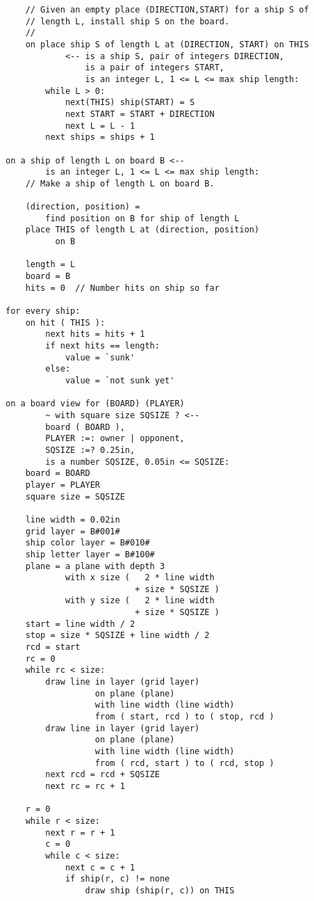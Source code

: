\documentclass[12pt]{article}
\begin{document}
\begin{verbatim}
    // Given an empty place (DIRECTION,START) for a ship S of
    // length L, install ship S on the board.
    //
    on place ship S of length L at (DIRECTION, START) on THIS
            <-- is a ship S, pair of integers DIRECTION,
                is a pair of integers START,
                is an integer L, 1 <= L <= max ship length:
        while L > 0:
            next(THIS) ship(START) = S
            next START = START + DIRECTION
            next L = L - 1
        next ships = ships + 1
    
on a ship of length L on board B <--
        is an integer L, 1 <= L <= max ship length:
    // Make a ship of length L on board B.

    (direction, position) =
        find position on B for ship of length L
    place THIS of length L at (direction, position)
          on B

    length = L
    board = B
    hits = 0  // Number hits on ship so far

for every ship:
    on hit ( THIS ):
        next hits = hits + 1
        if next hits == length:
            value = `sunk'
        else:
            value = `not sunk yet'

on a board view for (BOARD) (PLAYER)
        ~ with square size SQSIZE ? <--
        board ( BOARD ),
        PLAYER :=: owner | opponent,
        SQSIZE :=? 0.25in,
        is a number SQSIZE, 0.05in <= SQSIZE:
    board = BOARD
    player = PLAYER
    square size = SQSIZE

    line width = 0.02in
    grid layer = B#001#
    ship color layer = B#010#
    ship letter layer = B#100#
    plane = a plane with depth 3
            with x size (   2 * line width 
                          + size * SQSIZE )
            with y size (   2 * line width 
                          + size * SQSIZE )
    start = line width / 2
    stop = size * SQSIZE + line width / 2
    rcd = start
    rc = 0
    while rc < size:
        draw line in layer (grid layer)
                  on plane (plane)
                  with line width (line width)
                  from ( start, rcd ) to ( stop, rcd )
        draw line in layer (grid layer)
                  on plane (plane)
                  with line width (line width)
                  from ( rcd, start ) to ( rcd, stop )
        next rcd = rcd + SQSIZE
        next rc = rc + 1

    r = 0
    while r < size:
        next r = r + 1
        c = 0
        while c < size:
            next c = c + 1
            if ship(r, c) != none
                draw ship (ship(r, c)) on THIS


\end{verbatim}
\end{document}

